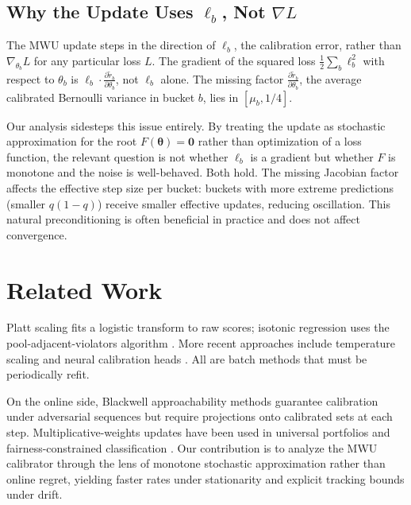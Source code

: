 \documentclass[12pt, letterpaper]{article}
\theoremstyle{definition}
\theoremstyle{remark}
\begin{document}
\subsection{Why the Update Uses $\ell_b$, Not $\nabla L$}
\label{sec:why_not_gradient}

The MWU update steps in the direction of $\ell_b$, the calibration error, rather than $\nabla_{\theta_b} L$ for any particular loss $L$. The gradient of the squared loss $\frac{1}{2}\sum_b \ell_b^2$ with respect to $\theta_b$ is $\ell_b \cdot \frac{\partial \tilde{r}_b}{\partial \theta_b}$, not $\ell_b$ alone. The missing factor $\frac{\partial \tilde{r}_b}{\partial \theta_b}$, the average calibrated Bernoulli variance in bucket $b$, lies in $[\mu_b, 1/4]$.

Our analysis sidesteps this issue entirely. By treating the update as stochastic approximation for the root $F(\boldsymbol{\theta}) = \mathbf{0}$ rather than optimization of a loss function, the relevant question is not whether $\ell_b$ is a gradient but whether $F$ is monotone and the noise is well-behaved. Both hold. The missing Jacobian factor affects the effective step size per bucket: buckets with more extreme predictions (smaller $q(1-q)$) receive smaller effective updates, reducing oscillation. This natural preconditioning is often beneficial in practice and does not affect convergence.

\section{Related Work}
\label{sec:related}

Platt scaling \citep{Platt99} fits a logistic transform to raw scores; isotonic regression uses the pool-adjacent-violators algorithm \citep{Zadrozny02}. More recent approaches include temperature scaling \citep{Guo17} and neural calibration heads \citep{Kull19}. All are batch methods that must be periodically refit.

On the online side, Blackwell approachability methods \citep{Foster18} guarantee calibration under adversarial sequences but require projections onto calibrated sets at each step. Multiplicative-weights updates have been used in universal portfolios \citep{Cover91} and fairness-constrained classification \citep{Agarwal18}. Our contribution is to analyze the MWU calibrator through the lens of monotone stochastic approximation rather than online regret, yielding faster rates under stationarity and explicit tracking bounds under drift.
\end{document}

